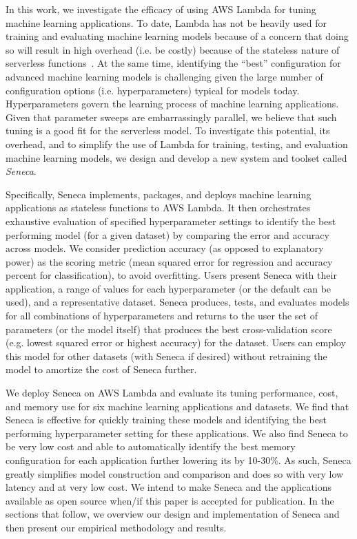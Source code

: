 In this work, we investigate the efficacy of using AWS Lambda
for tuning machine learning applications.
To date, Lambda has not be heavily used for training and evaluating
machine learning models because of a concern that 
doing so will result in high overhead (i.e. be costly) because
of the stateless nature of serverless functions~\cite{ref:onesteptwostep}.
At the same time, identifying the ``best'' configuration for advanced
machine learning models is challenging given the large number of configuration
options (i.e. hyperparameters) typical for models today.
Hyperparameters govern the learning process of machine learning applications.
Given that parameter sweeps are embarrassingly parallel, we believe
that such tuning is a good fit for the serverless model.
To investigate this potential, its overhead, and to simplify the 
use of Lambda for training, testing, and evaluation machine learning models, 
we design and develop a new system and toolset called \textit{Seneca}.

Specifically, Seneca implements, packages, and deploys 
machine learning applications as stateless functions to AWS Lambda.
It then orchestrates exhaustive evaluation of specified hyperparameter settings
to identify the best performing model (for a given dataset) by
comparing the error and accuracy across models.  We consider
prediction accuracy (as opposed to explanatory power) as the
scoring metric (mean squared error for regression 
and accuracy percent for classification), to avoid overfitting.
Users present Seneca with their application, a range of values for 
each hyperparameter (or the default can be used), and a representative dataset.
Seneca produces, tests, and evaluates models for all combinations 
of hyperparameters and returns to the user
the set of parameters (or the model itself) that produces
the best cross-validation score (e.g. lowest squared error or highest
accuracy) for the dataset. Users can employ this model for other datasets
(with Seneca if desired) without retraining the model to amortize the cost
of Seneca further.

We deploy Seneca on AWS Lambda and evaluate its tuning performance, cost,
and memory use for six machine learning applications and datasets. We 
find that Seneca is effective for quickly training these
models and identifying the best performing hyperparameter setting for 
these applications. We also find 
Seneca to be very low cost and able to automatically 
identify the 
best memory configuration for each application further lowering its 
by 10-30\%.
As such, Seneca greatly simplifies model construction and comparison and 
does so with very low latency and at very low cost.
We intend to make Seneca and the applications available as open source
when/if this paper is accepted for publication.  In the sections
that follow, we overview our design and implementation of Seneca and then
present our empirical methodology and results.


